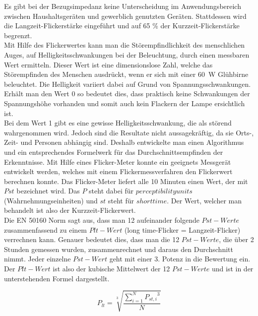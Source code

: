 Es gibt bei der Bezugsimpedanz keine Unterscheidung im Anwendungsbereich zwischen Haushaltsgeräten und gewerblich genutzten Geräten. Stattdessen wird die Langzeit-Flickerstärke eingeführt und auf 65 \% der Kurzzeit-Flickerstärke begrenzt.\\
Mit Hilfe des Flickerwertes kann man die Störempfindlichkeit des menschlichen Auges, auf Helligkeitsschwankungen bei der Beleuchtung, durch einen messbaren Wert ermitteln. Dieser Wert ist eine dimensionslose Zahl, welche das Störempfinden des Menschen ausdrückt, wenn er sich mit einer \SI{60}{W} Glühbirne beleuchtet. Die Helligkeit variiert dabei auf Grund von Spannungsschwankungen.
Erhält man den Wert 0 so bedeutet dies, dass praktisch keine Schwankungen der Spannungshöhe vorhanden und somit auch kein Flackern der Lampe ersichtlich ist.\\
Bei dem Wert 1 gibt es eine gewisse Helligkeitsschwankung, die als störend wahrgenommen wird. Jedoch sind die Resultate nicht aussagekräftig, da sie Orts-, Zeit- und Personen abhängig sind. Deshalb entwickelte man einen Algorithmus und ein entsprechendes Formelwerk für das Durchschnittsempfinden der Erkenntnisse. Mit Hilfe eines Flicker-Meter konnte ein geeignets Messgerät entwickelt werden, welches mit einem Flickermessverfahren den Flickerwert berechnen konnte. Das Flicker-Meter liefert alle 10 Minuten einen Wert, der mit $Pst$ bezeichnet wird. Das $P$ steht dabei für $perceptibility units$ (Wahrnehmungseinheiten) und $st$ steht für $short time$. Der Wert, welcher man behandelt ist also der Kurzzeit-Flickerwert.\\
Die EN 50160 Norm sagt aus, dass man 12 aufeinander folgende $Pst-Werte$ zusammenfassend zu einem $Plt-Wert$ (long time-Flicker = Langzeit-Flicker) verrechnen kann. Genauer bedeutet dies, dass man die 12 $Pst-Werte$, die über 2 Stunden gemessen wurden, zusammenrechnet und daraus den Durchschnitt nimmt. Jeder einzelne $Pst-Wert$ geht mit einer 3. Potenz in die Bewertung ein. Der $Plt-Wert$ ist also der kubische Mittelwert der 12 $Pst-Werte$ und ist in der unterstehenden Formel dargestellt.


\begin{equation}\label{eq:THDi}
P_{lt} = {\sqrt[3]{\frac{\sum_{i=1}^{N} {P_{st,i}}^3}{N}}}
\end{equation}


